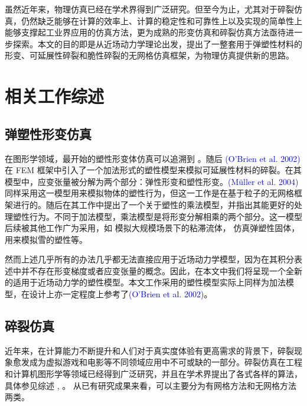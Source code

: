 虽然近年来，物理仿真已经在学术界得到广泛研究。但至今为止，尤其对于碎裂仿真，仍然缺乏能够在计算的效率上、计算的稳定性和可靠性上以及实现的简单性上能够支撑起工业界应用的仿真方法，更为成熟的形变仿真和碎裂仿真方法亟待进一步探索。本文的目的即是从近场动力学理论出发，提出了一整套用于弹塑性材料的形变、可延展性碎裂和脆性碎裂的无网格仿真框架，为物理仿真提供新的思路。

\section{相关工作综述}
\label{related_work}

\subsection{弹塑性形变仿真}

在图形学领域，最开始的塑性形变体仿真可以追溯到 。随后 \textcolor{blue}{(O'Brien et al. 2002)\supercite{OBrien2002}} 在 FEM 框架中引入了一个加法形式的塑性模型来模拟可延展性材料的碎裂。在其模型中，应变张量被分解为两个部分：弹性形变和塑性形变。\textcolor{blue}{(M\"{u}ller et al. 2004)\supercite{Muller2004}} 同样采用这一模型用来模拟物体的塑性行为，但这一工作是在基于粒子的无网格框架进行的。随后在其工作中提出了一个关于塑性的乘法模型，并指出其能更好的处理塑性行为。不同于加法模型，乘法模型是将形变分解相乘的两个部分。这一模型后续被其他工作广为采用，如 模拟大规模场景下的粘滞流体， 仿真弹塑性固体， 用来模拟雪的塑性等。

然而上述几乎所有的办法几乎都无法直接应用于近场动力学模型，因为在其积分表述中并不存在形变梯度或者应变张量的概念。因此，在本文中我们将呈现一个全新的适用于近场动力学的塑性模型。本文工作采用的塑性模型实际上同样为加法模型，在设计上亦一定程度上参考了\textcolor{blue}{(O'Brien et al. 2002)\supercite{OBrien2002}}。


\subsection{碎裂仿真}

近年来，在计算能力不断提升和人们对于真实度体验有更高需求的背景下，碎裂现象愈发成为虚拟游戏和电影等不同领域应用中不可或缺的一部分。碎裂仿真在工程和计算机图形学等领域已经得到广泛研究，并且在学术界提出了各式各样的算法，具体参见综述 , 。 从已有研究成果来看，可以主要分为有网格方法和无网格方法两类。


